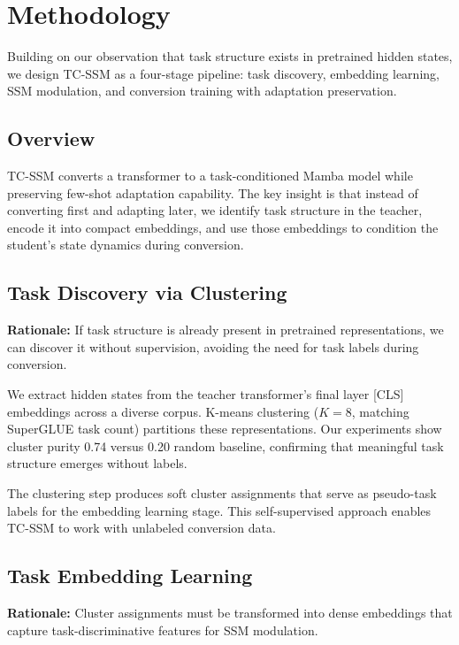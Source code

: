 \section{Methodology}

Building on our observation that task structure exists in pretrained hidden states, we design TC-SSM as a four-stage pipeline: task discovery, embedding learning, SSM modulation, and conversion training with adaptation preservation.

\subsection{Overview}

TC-SSM converts a transformer to a task-conditioned Mamba model while preserving few-shot adaptation capability. The key insight is that instead of converting first and adapting later, we identify task structure in the teacher, encode it into compact embeddings, and use those embeddings to condition the student's state dynamics during conversion.

\subsection{Task Discovery via Clustering}

\textbf{Rationale:} If task structure is already present in pretrained representations, we can discover it without supervision, avoiding the need for task labels during conversion.

We extract hidden states from the teacher transformer's final layer [CLS] embeddings across a diverse corpus. K-means clustering ($K=8$, matching SuperGLUE task count) partitions these representations. Our experiments show cluster purity 0.74 versus 0.20 random baseline, confirming that meaningful task structure emerges without labels.

The clustering step produces soft cluster assignments that serve as pseudo-task labels for the embedding learning stage. This self-supervised approach enables TC-SSM to work with unlabeled conversion data.

\subsection{Task Embedding Learning}

\textbf{Rationale:} Cluster assignments must be transformed into dense embeddings that capture task-discriminative features for SSM modulation.

